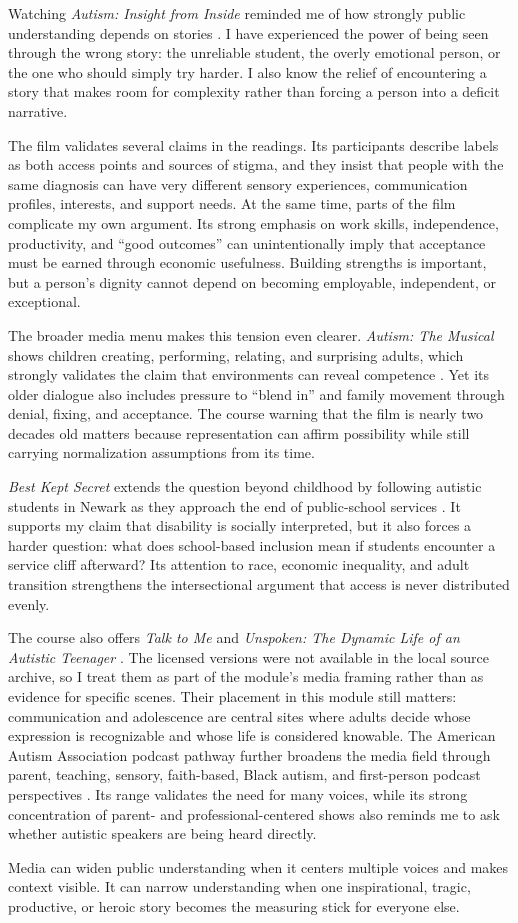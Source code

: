 
Watching \textit{Autism: Insight from Inside} reminded me of how strongly public understanding depends on stories \citep{infobase2016inside}. I have experienced the power of being seen through the wrong story: the unreliable student, the overly emotional person, or the one who should simply try harder. I also know the relief of encountering a story that makes room for complexity rather than forcing a person into a deficit narrative.

The film validates several claims in the readings. Its participants describe labels as both access points and sources of stigma, and they insist that people with the same diagnosis can have very different sensory experiences, communication profiles, interests, and support needs. At the same time, parts of the film complicate my own argument. Its strong emphasis on work skills, independence, productivity, and ``good outcomes'' can unintentionally imply that acceptance must be earned through economic usefulness. Building strengths is important, but a person's dignity cannot depend on becoming employable, independent, or exceptional.

The broader media menu makes this tension even clearer. \textit{Autism: The Musical} shows children creating, performing, relating, and surprising adults, which strongly validates the claim that environments can reveal competence \citep{regan2007musical}. Yet its older dialogue also includes pressure to ``blend in'' and family movement through denial, fixing, and acceptance. The course warning that the film is nearly two decades old matters because representation can affirm possibility while still carrying normalization assumptions from its time.

\textit{Best Kept Secret} extends the question beyond childhood by following autistic students in Newark as they approach the end of public-school services \citep{buck2013best}. It supports my claim that disability is socially interpreted, but it also forces a harder question: what does school-based inclusion mean if students encounter a service cliff afterward? Its attention to race, economic inequality, and adult transition strengthens the intersectional argument that access is never distributed evenly.

The course also offers \textit{Talk to Me} and \textit{Unspoken: The Dynamic Life of an Autistic Teenager} \citep{talkToMe2007,unspoken2018}. The licensed versions were not available in the local source archive, so I treat them as part of the module's media framing rather than as evidence for specific scenes. Their placement in this module still matters: communication and adolescence are central sites where adults decide whose expression is recognizable and whose life is considered knowable. The American Autism Association podcast pathway further broadens the media field through parent, teaching, sensory, faith-based, Black autism, and first-person podcast perspectives \citep{aaa2022podcasts}. Its range validates the need for many voices, while its strong concentration of parent- and professional-centered shows also reminds me to ask whether autistic speakers are being heard directly.

Media can widen public understanding when it centers multiple voices and makes context visible. It can narrow understanding when one inspirational, tragic, productive, or heroic story becomes the measuring stick for everyone else.
